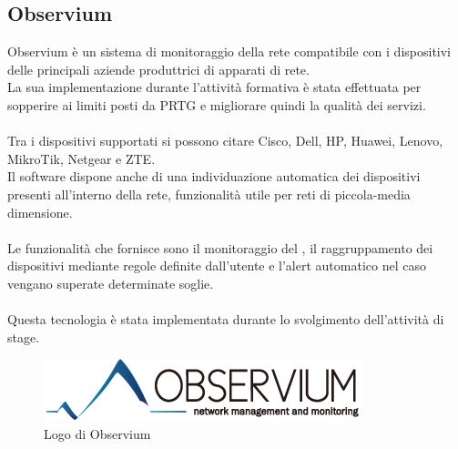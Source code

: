 \documentclass[Tesi.tex]{subfiles}
\begin{document}
\subsection{Observium}
Observium è un sistema di monitoraggio della rete compatibile con i dispositivi delle principali aziende produttrici di apparati di rete. \\
La sua implementazione durante l'attività formativa è stata effettuata per sopperire ai limiti posti da PRTG e migliorare quindi la qualità dei servizi. \\\\
Tra i dispositivi supportati si possono citare Cisco, Dell, HP, Huawei, Lenovo, MikroTik, Netgear e ZTE. \\
Il software dispone anche di una individuazione automatica dei dispositivi presenti all'interno della rete, funzionalità utile per reti di piccola-media dimensione. \\\\
Le funzionalità che fornisce sono il monitoraggio del , il raggruppamento dei dispositivi mediante regole definite dall'utente e l'alert automatico nel caso vengano superate determinate soglie.\\\\
Questa tecnologia è stata implementata durante lo svolgimento dell'attività di stage.

\begin{figure}[H]
	\centering
	\includegraphics[width=0.4\linewidth]{"images/logo/Observium_logo"}
	\caption{Logo di Observium}
	\label{fig:Logo di Observium}
\end{figure}
\end{document}
